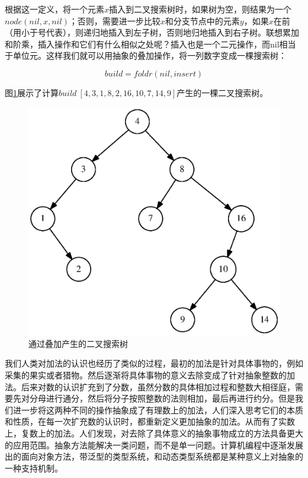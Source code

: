 \documentclass{article}
\begin{document}
根据这一定义，将一个元素$x$插入到二叉搜索树时，如果树为空，则结果为一个$node(nil, x, nil)$；否则，需要进一步比较$x$和分支节点中的元素$y$，如果$x$在前（用小于号代表），则递归地插入到左子树，否则地归地插入到右子树。联想累加和阶乘，插入操作和它们有什么相似之处呢？插入也是一个二元操作，而nil相当于单位元。这样我们就可以用抽象的叠加操作，将一列数字变成一棵搜索树：

\[
build = foldr(nil, insert)
\]

图\ref{fig:bst-example}展示了计算$build\ [4, 3, 1, 8, 2, 16, 10, 7, 14, 9]$产生的一棵二叉搜索树。

\begin{figure}[htbp]
  \centering
  \includegraphics[scale=0.5]{img/bst-example.ps}
  \caption{通过叠加产生的二叉搜索树}
  \label{fig:bst-example}
\end{figure}

我们人类对加法的认识也经历了类似的过程，最初的加法是针对具体事物的，例如采集的果实或者猎物。然后逐渐将具体事物的意义去除变成了针对抽象整数的加法。后来对数的认识扩充到了分数，虽然分数的具体相加过程和整数大相径庭，需要先对分母进行通分，然后将分子按照整数的法则相加，最后再进行约分。但是我们进一步将这两种不同的操作抽象成了有理数上的加法，人们深入思考它们的本质和性质，在每一次扩充数的认识时，都重新定义更加抽象的加法。从而有了实数上，复数上的加法。人们发现，对去除了具体意义的抽象事物成立的方法具备更大的应用范围。抽象方法能解决一类问题，而不是单一问题。计算机编程中逐渐发展出的面向对象方法，带泛型的类型系统，和动态类型系统都是某种意义上对抽象的一种支持机制。
\end{document}
